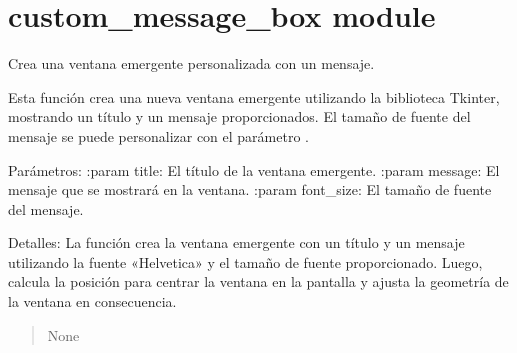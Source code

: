 \documentclass[letterpaper,10pt,spanish]{sphinxmanual}
\begin{document}
\sphinxstepscope


\chapter{custom\_message\_box module}
\label{\detokenize{custom_message_box:module-custom_message_box}}\label{\detokenize{custom_message_box:custom-message-box-module}}\label{\detokenize{custom_message_box::doc}}

\begin{fulllineitems}
\label{\detokenize{custom_message_box:custom_message_box.custom_message_box}}
\pysigstartsignatures
{}
\pysigstopsignatures
\sphinxAtStartPar
Crea una ventana emergente personalizada con un mensaje.

\sphinxAtStartPar
Esta función crea una nueva ventana emergente utilizando la biblioteca Tkinter,
mostrando un título y un mensaje proporcionados. El tamaño de fuente del mensaje
se puede personalizar con el parámetro .

\sphinxAtStartPar
Parámetros:
:param title: El título de la ventana emergente.
:param message: El mensaje que se mostrará en la ventana.
:param font\_size: El tamaño de fuente del mensaje.

\sphinxAtStartPar
Detalles:
La función crea la ventana emergente con un título y un mensaje utilizando la
fuente «Helvetica» y el tamaño de fuente proporcionado. Luego, calcula la posición
para centrar la ventana en la pantalla y ajusta la geometría de la ventana en consecuencia.
\begin{quote}\begin{description}
\sphinxAtStartPar
None

\end{description}\end{quote}

\end{fulllineitems}
\end{document}
